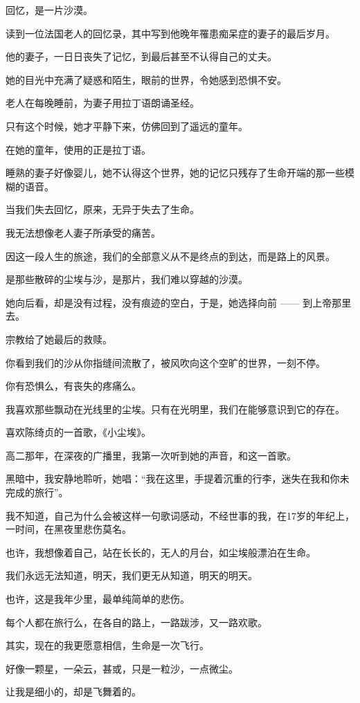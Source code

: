 		回忆，是一片沙漠。\par
		读到一位法国老人的回忆录，其中写到他晚年罹患痴呆症的妻子的最后岁月。\par
		他的妻子，一日日丧失了记忆，到最后甚至不认得自己的丈夫。\par
		她的目光中充满了疑惑和陌生，眼前的世界，令她感到恐惧不安。\par
		老人在每晚睡前，为妻子用拉丁语朗诵圣经。\par
		只有这个时候，她才平静下来，仿佛回到了遥远的童年。\par
		在她的童年，使用的正是拉丁语。\par
		睡熟的妻子好像婴儿，她不认得这个世界，她的记忆只残存了生命开端的那一些模糊的语音。\par
		当我们失去回忆，原来，无异于失去了生命。\par
		我无法想像老人妻子所承受的痛苦。\par
		因这一段人生的旅途，我们的全部意义从不是终点的到达，而是路上的风景。\par
		是那些散碎的尘埃与沙，是那片，我们难以穿越的沙漠。\par
		她向后看，却是没有过程，没有痕迹的空白，于是，她选择向前 —— 到上帝那里去。\par
		宗教给了她最后的救赎。

		你看到我们的沙从你指缝间流散了，被风吹向这个空旷的世界，一刻不停。\par
		你有恐惧么，有丧失的疼痛么。\par
		我喜欢那些飘动在光线里的尘埃。只有在光明里，我们在能够意识到它的存在。\par
		喜欢陈绮贞的一首歌，《小尘埃》。\par
		高二那年，在深夜的广播里，我第一次听到她的声音，和这一首歌。\par
		黑暗中，我安静地聆听，她唱：“我在这里，手提着沉重的行李，迷失在我和你未完成的旅行”。\par
		我不知道，自己为什么会被这样一句歌词感动，不经世事的我，在17岁的年纪上，一时间，在黑夜里悲伤莫名。\par
		也许，我想像着自己，站在长长的，无人的月台，如尘埃般漂泊在生命。\par
		我们永远无法知道，明天，我们更无从知道，明天的明天。\par
		也许，这是我年少里，最单纯简单的悲伤。\par
		每个人都在旅行么，在各自的路上，一路跋涉，又一路欢歌。\par
		其实，现在的我更愿意相信，生命是一次飞行。\par
		好像一颗星，一朵云，甚或，只是一粒沙，一点微尘。\par
		让我是细小的，却是飞舞着的。

